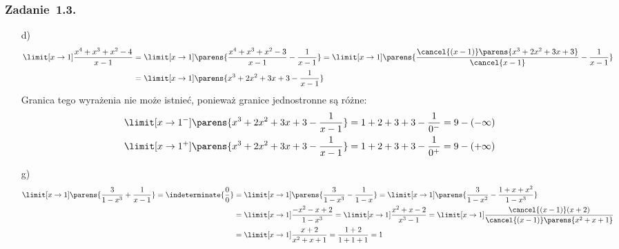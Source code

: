 \subsubsection*{Zadanie~1.3.}
\begin{itemize}
    \item[d)]
        \begin{equation*}
            \begin{split}
                \limit[x \to 1] \frac{x^4 + x^3 + x^2 - 4}{x - 1} &= \limit[x \to 1] \parens{\frac{x^4 + x^3 + x^2 - 3}{x - 1} - \frac{1}{x - 1}}
                    = \limit[x \to 1] \parens{\frac{\cancel{(x - 1)} \parens{x^3 + 2x^2 + 3x + 3}}{\cancel{x - 1}} - \frac{1}{x - 1}}\\
                    &= \limit[x \to 1] \parens{x^3 + 2x^2 + 3x + 3 - \frac{1}{x - 1}}
            \end{split}
        \end{equation*}
        Granica tego wyrażenia nie może istnieć, ponieważ granice jednostronne są różne:
        \begin{gather*}
            \limit[x \to 1^{-}] \parens{x^3 + 2x^2 + 3x + 3 - \frac{1}{x - 1}} = 1 + 2 + 3 + 3 - \frac{1}{0^{-}} = 9 - (-\infty)\\
            \limit[x \to 1^{+}] \parens{x^3 + 2x^2 + 3x + 3 - \frac{1}{x - 1}} = 1 + 2 + 3 + 3 - \frac{1}{0^{+}} = 9 - (+\infty)\\
        \end{gather*}
    \item[g)]
        \begin{equation*}
            \begin{split}
                \limit[x \to 1] \parens{\frac{3}{1 - x^3} + \frac{1}{x - 1}}
                    = \indeterminate{\frac{0}{0}}
                    &= \limit[x \to 1] \parens{\frac{3}{1 - x^3} - \frac{1}{1 - x}}
                    = \limit[x \to 1] \parens{\frac{3}{1 - x^2} - \frac{1 + x + x^2}{1 - x^3}}\\
                    &= \limit[x \to 1] \frac{-x^2 - x + 2}{1 - x^3} = \limit[x \to 1] \frac{x^2 + x - 2}{x^3 - 1}
                    = \limit[x \to 1] \frac{\cancel{(x - 1)}(x + 2)}{\cancel{(x - 1)} \parens{x^2 + x + 1}}\\
                    &= \limit[x \to 1] \frac{x + 2}{x^2 + x + 1}
                    = \frac{1 + 2}{1 + 1 + 1}
                    = 1
            \end{split}
        \end{equation*}
\end{itemize}
